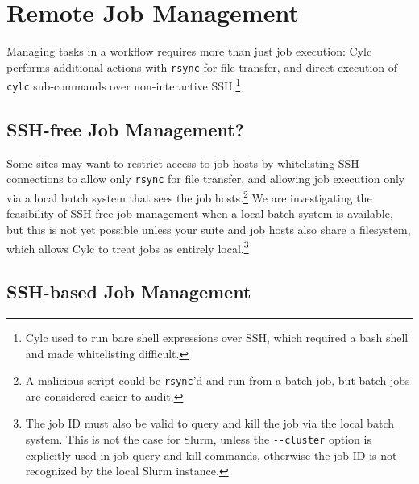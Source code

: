 \section{Remote Job Management}

Managing tasks in a workflow requires more than just job execution: Cylc
performs additional actions with \lstinline=rsync= for file transfer, and
direct execution of \lstinline=cylc= sub-commands over non-interactive
SSH.\footnote{Cylc used to run bare shell expressions over SSH, which required
a bash shell and made whitelisting difficult.}

\subsection{SSH-free Job Management?}

Some sites may want to restrict access to job hosts by whitelisting SSH
connections to allow only \lstinline=rsync= for file transfer, and allowing job
execution only via a local batch system that sees the job hosts.\footnote{A
malicious script could be \lstinline=rsync='d and run from a batch job, but
batch jobs are considered easier to audit.} We are investigating the
feasibility of SSH-free job management when a local batch system is available,
but this is not yet possible unless your suite and job hosts also share a
filesystem, which allows Cylc to treat jobs as entirely local.\footnote{The job ID
must also be valid to query and kill the job via the local batch system. This
is not the case for Slurm, unless the \lstinline=--cluster= option is
explicitly used in job query and kill commands, otherwise the job ID is not
recognized by the local Slurm instance.}

\subsection{SSH-based Job Management}

